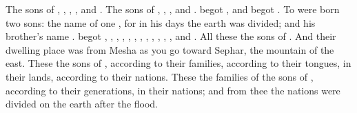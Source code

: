 \bverse The sons of  \were {}, , , , and .
\bverse The sons of  \were {}, , , and .
\bverse {} begot , and  begot .
\bverse To  were born two sons: the name of one \was {}, for in his days the earth was divided; and his brother's name \was {}.
\bverse {} begot , , , ,
\bverse {}, , ,
\bverse {}, , ,
\bverse {}, , and . All these \were the sons of .
\bverse And their dwelling place was from Mesha as you go toward Sephar, the mountain of the east.
\bverse These \were the sons of , according to their families, according to their tongues, in their lands, according to their nations.
\bverse These \were the families of the sons of , according to their generations, in their nations; and from thee the nations were divided on the earth after the flood.
